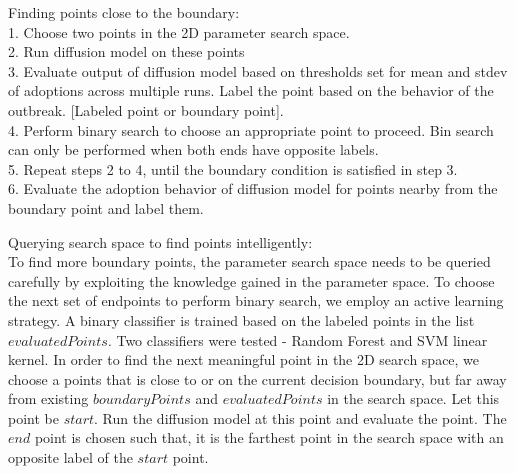 Finding points close to the boundary:\\
1. Choose two points in the 2D parameter search space.\\
2. Run diffusion model on these points\\
3. Evaluate output of diffusion model based on thresholds set for mean and stdev of adoptions across multiple runs. Label the point based on the behavior of the outbreak. [Labeled point or boundary point].\\
4. Perform binary search to choose an appropriate point to proceed. Bin search can only be performed when both ends have opposite labels.\\
5. Repeat steps 2 to 4, until the boundary condition is satisfied in step 3.\\
6. Evaluate the adoption behavior of diffusion model for points nearby from the boundary point and label them.

Querying search space to find points intelligently:\\
To find more boundary points, the parameter search space needs to be queried carefully by exploiting the knowledge gained in the parameter space. To choose the next set of endpoints to perform binary search, we employ an active learning strategy. A binary classifier is trained based on the labeled points in the list $evaluatedPoints$. Two classifiers were tested - Random Forest and SVM linear kernel.
In order to find the next meaningful point in the 2D search space, we choose a points that is close to or on the current decision boundary, but far away from existing $boundaryPoints$ and $evaluatedPoints$ in the search space. 
Let this point be $start$. Run the diffusion model at this point and evaluate the point. The $end$ point is chosen such that, it is the farthest point in the search space with an opposite label of the $start$ point.

